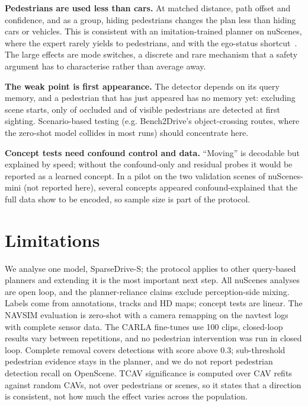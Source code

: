 \documentclass[journal]{IEEEtran}
\begin{document}
\textbf{Pedestrians are used less than cars.} At matched distance, path offset and confidence, and as a group, hiding
pedestrians changes the plan less than hiding cars or vehicles. This is consistent with an imitation-trained planner on
nuScenes, where the expert rarely yields to pedestrians, and with the ego-status shortcut~\cite{zhai2023admlp,li2024egostatus}.
The large effects are mode switches, a discrete and rare mechanism that a safety argument has to characterise rather
than average away.

\textbf{The weak point is first appearance.} The detector depends on its query memory, and a pedestrian that has
just appeared has no memory yet: excluding scene starts, only \FanOccZero{} of occluded and \FanVisZero{} of visible
pedestrians are detected at first sighting. Scenario-based testing (e.g. Bench2Drive's object-crossing
routes, where the zero-shot model collides in most runs) should concentrate here.

\textbf{Concept tests need confound control and data.} ``Moving'' is decodable but explained by speed; without the
confound-only and residual probes it would be reported as a learned concept. In a pilot on the two validation scenes of
nuScenes-mini (not reported here), several concepts appeared confound-explained that the full data show to be encoded, so
sample size is part of the protocol.

\section{Limitations}
We analyse one model, SparseDrive-S; the protocol applies to other query-based planners and extending it is the most
important next step. All nuScenes analyses are open loop, and the planner-reliance claims exclude perception-side
mixing. Labels come from annotations, tracks and HD maps; concept tests are linear. The NAVSIM evaluation is zero-shot
with a camera remapping on the \NavLogs{} navtest logs with complete sensor data. The CARLA fine-tunes use 100 clips,
closed-loop results vary between repetitions, and no pedestrian intervention was run in closed loop. Complete removal
covers detections with score above 0.3; sub-threshold pedestrian evidence stays in the planner, and we do not report
pedestrian detection recall on OpenScene. TCAV significance is computed over CAV refits against random CAVs, not over
pedestrians or scenes, so it states that a direction is consistent, not how much the effect varies across the population.
\end{document}
